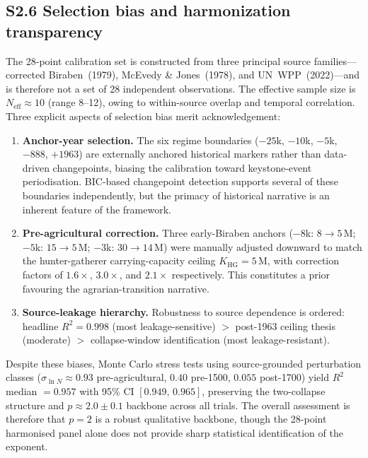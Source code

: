 \documentclass[11pt]{article}
\begin{document}
\pagebreak

\subsection*{S2.6 Selection bias and harmonization transparency}

The 28-point calibration set is constructed from three
principal source families---corrected Biraben~(1979), McEvedy \&
Jones~(1978), and UN~WPP~(2022)---and is therefore not a set of
28 independent observations.  The effective sample size is
$N_{\mathrm{eff}}\approx 10$ (range 8--12), owing to within-source
overlap and temporal correlation.  Three explicit aspects of selection
bias merit acknowledgement:

\begin{enumerate}
\item \textbf{Anchor-year selection.}  The six regime boundaries
  ($-25$k, $-10$k, $-5$k, $-888$, $+1963$) are externally anchored
  historical markers rather than data-driven changepoints, biasing the
  calibration toward keystone-event periodisation.  BIC-based
  changepoint detection supports several of these boundaries
  independently, but the primacy of historical narrative is an
  inherent feature of the framework.

\item \textbf{Pre-agricultural correction.}  Three early-Biraben
  anchors ($-8$k: $8\to 5$\,M; $-5$k: $15\to 5$\,M; $-3$k:
  $30\to 14$\,M) were manually adjusted downward to match the
  hunter-gatherer carrying-capacity ceiling $K_{\mathrm{HG}}=5$\,M,
  with correction factors of $1.6\times$, $3.0\times$, and
  $2.1\times$ respectively.  This constitutes a prior favouring the
  agrarian-transition narrative.

\item \textbf{Source-leakage hierarchy.}  Robustness to source
  dependence is ordered:
  headline $R^2=0.998$ (most leakage-sensitive) $>$
  post-1963 ceiling thesis (moderate) $>$
  collapse-window identification (most leakage-resistant).
\end{enumerate}

Despite these biases, Monte Carlo stress tests using source-grounded
perturbation classes ($\sigma_{\ln N}\approx 0.93$ pre-agricultural,
$0.40$ pre-1500, $0.055$ post-1700) yield $R^2$ median $= 0.957$
with 95\% CI $[0.949,\,0.965]$, preserving the two-collapse structure
and $p\approx 2.0\pm 0.1$ backbone across all trials.  The overall
assessment is therefore that $p=2$ is a robust qualitative backbone,
though the 28-point harmonised panel alone does not provide sharp
statistical identification of the exponent.
\end{document}
